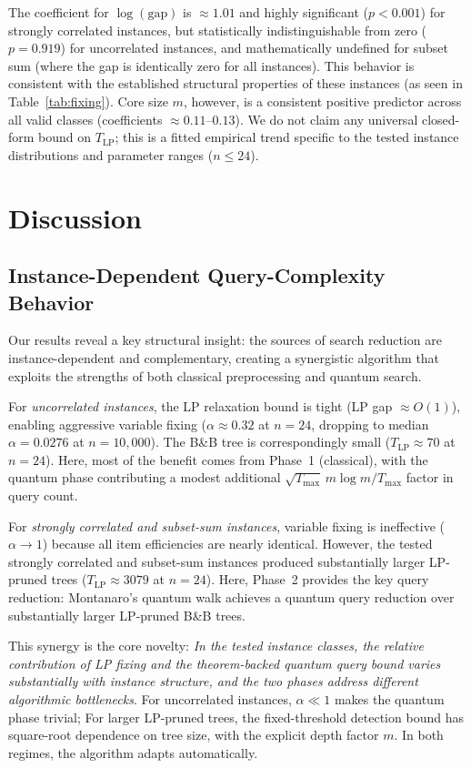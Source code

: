 \documentclass[conference]{IEEEtran} \IEEEoverridecommandlockouts
\begin{document}
The coefficient for $\log(\text{gap})$ is $\approx 1.01$ and highly significant ($p < 0.001$) for strongly correlated instances, but statistically indistinguishable from zero ($p = 0.919$) for uncorrelated instances, and mathematically undefined for subset sum (where the gap is identically zero for all instances). This behavior is consistent with the established structural properties of these instances (as seen in Table~\ref{tab:fixing}). Core size $m$, however, is a consistent positive predictor across all valid classes (coefficients $\approx 0.11\text{--}0.13$). We do not claim any universal closed-form bound on $T_{\text{LP}}$; this is a fitted empirical trend specific to the tested instance distributions and parameter ranges ($n \le 24$).

\section{Discussion}

\subsection{Instance-Dependent Query-Complexity Behavior}

Our results reveal a key structural insight: the sources of search reduction are instance-dependent and complementary, creating a synergistic algorithm that exploits the strengths of both classical preprocessing and quantum search.

For \textit{uncorrelated instances}, the LP relaxation bound is tight (LP gap $\approx O(1)$), enabling aggressive variable fixing ($\alpha \approx 0.32$ at $n = 24$, dropping to median $\alpha = 0.0276$ at $n = 10{,}000$). The B\&B tree is correspondingly small ($T_{\text{LP}} \approx 70$ at $n=24$). Here, most of the benefit comes from Phase~1 (classical), with the quantum phase contributing a modest additional $\sqrt{T_{\max}}\,m\log m / T_{\max}$ factor in query count.

For \textit{strongly correlated and subset-sum instances}, variable fixing is ineffective ($\alpha \to 1$) because all item efficiencies are nearly identical. However, the tested strongly correlated and subset-sum instances produced substantially larger LP-pruned trees ($T_{\text{LP}} \approx 3079$ at $n=24$). Here, Phase~2 provides the key query reduction: Montanaro's quantum walk achieves a quantum query reduction over substantially larger LP-pruned B\&B trees.

This synergy is the core novelty: \textit{In the tested instance classes, the relative contribution of LP fixing and the theorem-backed quantum query bound varies substantially with instance structure, and the two phases address different algorithmic bottlenecks}. For uncorrelated instances, $\alpha \ll 1$ makes the quantum phase trivial; For larger LP-pruned trees, the fixed-threshold detection bound has square-root dependence on tree size, with the explicit depth factor $m$. In both regimes, the algorithm adapts automatically.
\end{document}
